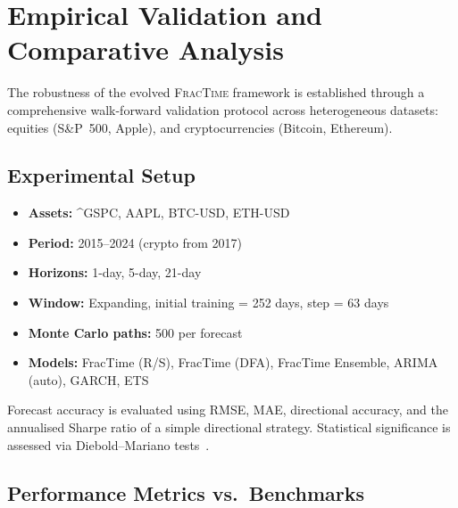 \documentclass[12pt,a4paper]{article}
\begin{document}
\section{Empirical Validation and Comparative Analysis}
\label{sec:empirical}

The robustness of the evolved \textsc{FracTime} framework is established
through a comprehensive walk-forward validation protocol across
heterogeneous datasets: equities (S\&P~500, Apple), and cryptocurrencies
(Bitcoin, Ethereum).

\subsection{Experimental Setup}

\begin{itemize}
  \item \textbf{Assets:} \^{}GSPC, AAPL, BTC-USD, ETH-USD
  \item \textbf{Period:} 2015--2024 (crypto from 2017)
  \item \textbf{Horizons:} 1-day, 5-day, 21-day
  \item \textbf{Window:} Expanding, initial training = 252 days, step = 63 days
  \item \textbf{Monte Carlo paths:} 500 per forecast
  \item \textbf{Models:} FracTime (R/S), FracTime (DFA), FracTime Ensemble,
        ARIMA (auto), GARCH, ETS
\end{itemize}

Forecast accuracy is evaluated using RMSE, MAE, directional accuracy, and
the annualised Sharpe ratio of a simple directional strategy.  Statistical
significance is assessed via Diebold--Mariano tests~\citep{DieboldMariano1995}.

\subsection{Performance Metrics vs.\ Benchmarks}
\end{document}
